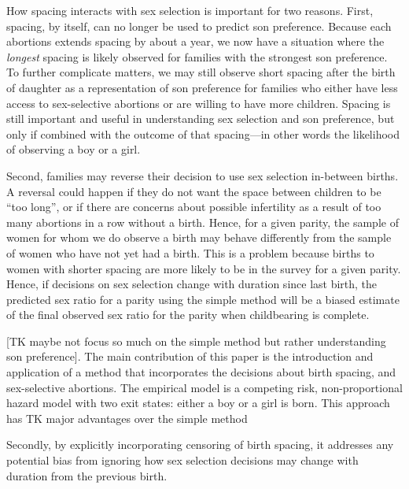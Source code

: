 \documentclass[12pt,letterpaper]{article}
\begin{document}
How spacing interacts with sex selection is important for two reasons.
First, 
spacing, by itself, can no longer be used to predict son preference. 
Because each abortions extends spacing by about a year, we now have a situation 
where the \emph{longest} spacing is likely observed for families with the 
strongest son preference.
To further complicate matters, 
we may still observe short spacing after the birth of daughter as a representation 
of son preference for families who either have less access to sex-selective 
abortions or are willing to have more children.
Spacing is still important and useful in understanding sex selection and son
preference, but only if combined with the outcome of that spacing---in other words 
the likelihood of observing a boy or a girl.

Second, families may reverse their decision to use sex selection in-between births.
A reversal could happen if they do not want the space between children to be 
``too long'', or if there are concerns about possible infertility as a result of 
too many abortions in a row without a birth.
Hence, for a given parity, the sample of women for whom we do observe a birth 
may behave differently from the sample of women who have not yet had a birth.
This is a problem because births to women with shorter spacing are more likely 
to be in the survey for a given parity.
Hence, if decisions on sex selection change with duration since last birth,
the predicted sex ratio for a parity using the simple method will be a 
biased estimate of the final observed sex ratio for the parity when 
childbearing is complete.



[TK maybe not focus so much on the simple method but rather understanding son preference].
The main contribution of this paper is the introduction and application of a method that 
incorporates the decisions about birth spacing, and sex-selective abortions.
The empirical model is a competing risk, non-proportional hazard model with two exit 
states: either a boy or a girl is born.
This approach has TK major advantages over the simple method 

Secondly, by explicitly incorporating censoring of birth spacing, it addresses any 
potential bias from ignoring how sex selection decisions may change with duration from 
the previous birth.
\end{document}
